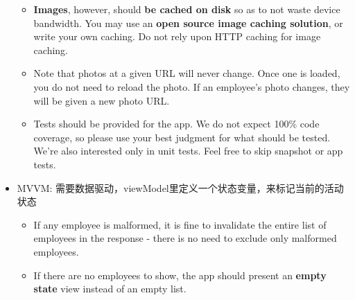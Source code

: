 \documentclass[9pt, b5paper]{article}
\begin{document}
\begin{itemize}
\begin{itemize}
\item \textbf{Images}, however, should \textbf{be cached on disk} so as to not waste device bandwidth. You may use an \textbf{open source image caching solution}, or write your own caching. Do not rely upon HTTP caching for image caching.
\item Note that photos at a given URL will never change. Once one is loaded, you do not need to reload the photo. If an employee’s photo changes, they will be given a new photo URL.
\item Tests should be provided for the app. We do not expect 100\% code coverage, so please use your best judgment for what should be tested. We’re also interested only in unit tests. Feel free to skip snapshot or app tests.
\end{itemize}
\item MVVM: 需要数据驱动，viewModel里定义一个状态变量，来标记当前的活动状态
\begin{itemize}
\item If any employee is malformed, it is fine to invalidate the entire list of employees in the response - there is no need to exclude only malformed employees.
\item If there are no employees to show, the app should present an \textbf{empty state} view instead of an empty list.
\end{itemize}
\end{itemize}
\end{document}
